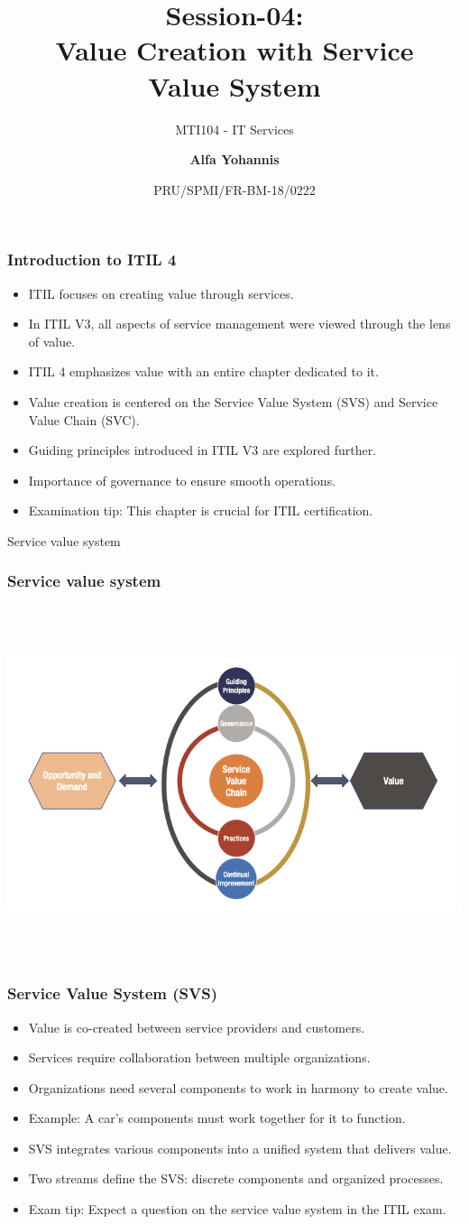 \documentclass[aspectratio=169, table]{beamer}
\subtitle{MTI104 - IT Services}
\title{Session-04:\\\LARGE{Value Creation with Service \\Value System}}
\date[Serial]{\scriptsize {PRU/SPMI/FR-BM-18/0222}}
\author[Pradita]{\small{\textbf{Alfa Yohannis}}}
\begin{document}
\frame{\titlepage}

\begin{frame}
	\frametitle{Introduction to ITIL 4}
	\begin{itemize}
		\item ITIL focuses on creating value through services.
		\item In ITIL V3, all aspects of service management were viewed through the lens of value.
		\item ITIL 4 emphasizes value with an entire chapter dedicated to it.
		\item Value creation is centered on the Service Value System (SVS) and Service Value Chain (SVC).
		\item Guiding principles introduced in ITIL V3 are explored further.
		\item Importance of governance to ensure smooth operations.
		\item Examination tip: This chapter is crucial for ITIL certification.
	\end{itemize}
\end{frame}

\begin{frame}{Service value system} 	 \frametitle{ Service value system} \begin{center} 	\includegraphics[width=0.6\linewidth]{images/image-01.png} \end{center} \end{frame}

\begin{frame}
	\frametitle{Service Value System (SVS)}
	\begin{itemize}
		\item Value is co-created between service providers and customers.
		\item Services require collaboration between multiple organizations.
		\item Organizations need several components to work in harmony to create value.
		\item Example: A car's components must work together for it to function.
		\item SVS integrates various components into a unified system that delivers value.
		\item Two streams define the SVS: discrete components and organized processes.
		\item Exam tip: Expect a question on the service value system in the ITIL exam.
	\end{itemize}
\end{frame}
\end{document}

